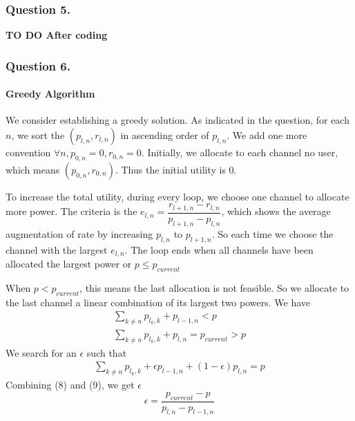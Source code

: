 \documentclass[11pt, oneside]{report}
\begin{document}
\subsubsection{Question 5.}
\textbf{TO DO After coding}

\subsubsection{Question 6.}
\paragraph{Greedy Algorithm}
We consider establishing a greedy solution. As indicated in the question, for each $n$, we sort the $(p_{l,n}, r_{l,n})$ in ascending order of $p_{l,n}$. We add one more convention $\forall n, p_{0,n} = 0, r_{0,n} = 0 $. Initially, we allocate to each channel no user, which means $(p_{0,n}, r_{0,n})$. Thus the initial utility is 0.

To increase the total utility, during every loop, we choose one channel to allocate more power. The criteria is the $e_{l,n} = \dfrac{r_{l+1,n} - r_{l,n}}{p_{l+1,n} - p_{l,n}}$, which shows the average augmentation of rate by increasing $p_{l,n}$ to $p_{l+1,n}$. So each time we choose the channel with the largest $e_{l,n}$. The loop ends when all channels have been allocated the largest power or $p \leq p_{current}$

When $p < p_{current}$, this means the last allocation is not feasible. So we allocate to the last channel a linear combination of its largest two powers. We have
\begin{align}
\sum_{k \ne n} p_{l_k,k} + p_{l-1,n} < p \\
\sum_{k \ne n} p_{l_k,k} + p_{l,n} = p_{current} > p
\end{align}
We search for an $\epsilon$ such that
\begin{align}
\sum_{k \ne n} p_{l_k,k} + \epsilon p_{l-1,n} + (1-\epsilon) p_{l,n} = p
\end{align}
Combining (8) and (9), we get $\epsilon$
$$ \epsilon = \dfrac{p_{current} - p}{p_{l,n} - p_{l-1,n}}$$
\end{document}
